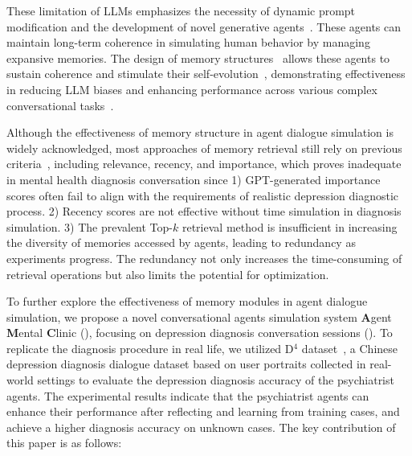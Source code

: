 These limitation of LLMs emphasizes the necessity of dynamic prompt modification and the development of novel generative agents~\cite{Park2023GenerativeAgents}. These agents can maintain long-term coherence in simulating human behavior by managing expansive memories. The design of memory structures~\cite{zhang2024surveymemorymechanismlarge} allows these agents to sustain coherence and stimulate their self-evolution~\cite{zhang2024training, zhang2024surveymemorymechanismlarge}, demonstrating effectiveness in reducing LLM biases and enhancing performance across various complex conversational tasks~\cite{qian2024chatdevcommunicativeagentssoftware,wu2023autogenenablingnextgenllm, Li2024AgentHA}.






Although the effectiveness of memory structure in agent dialogue simulation is widely acknowledged, most approaches of memory retrieval still rely on previous criteria~\cite{Park2023GenerativeAgents}, including relevance, recency, and importance, which proves inadequate in mental health diagnosis conversation since 1) GPT-generated importance scores often fail to align with the requirements of realistic depression diagnostic process. 2) Recency scores are not effective without time simulation in diagnosis simulation. 3) The prevalent Top-$k$ retrieval method is insufficient in increasing the diversity of memories accessed by agents, leading to redundancy as experiments progress. The redundancy not only increases the time-consuming of retrieval operations but also limits the potential for optimization.


To further explore the effectiveness of memory modules in agent dialogue simulation, we propose a novel conversational agents simulation system \textbf{A}gent \textbf{M}ental \textbf{C}linic (\system), focusing on depression diagnosis conversation sessions (). To replicate the diagnosis procedure in real life, we utilized D$^4$ dataset~\cite{yao-etal-2022-d4}, a Chinese depression diagnosis dialogue dataset based on user portraits collected in real-world settings to evaluate the depression diagnosis accuracy of the psychiatrist agents. The experimental results indicate that the psychiatrist agents can enhance their performance after reflecting and learning from training cases, and achieve a higher diagnosis accuracy on unknown cases.
The key contribution of this paper is as follows:

